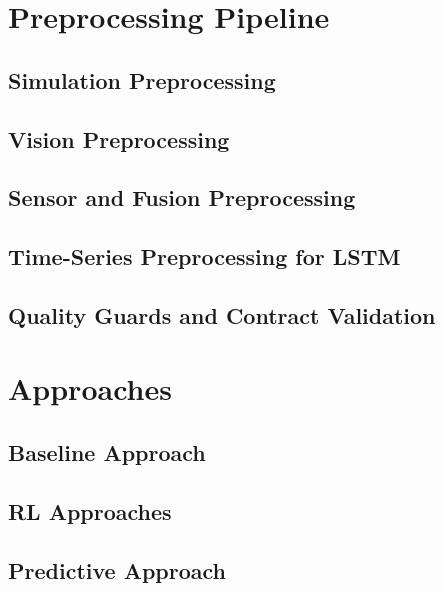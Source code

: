 \documentclass[conference]{IEEEtran}
\begin{document}
\section{Preprocessing Pipeline}
\subsection{Simulation Preprocessing}

\subsection{Vision Preprocessing}

\subsection{Sensor and Fusion Preprocessing}

\subsection{Time-Series Preprocessing for LSTM}

\subsection{Quality Guards and Contract Validation}

\section{Approaches}
\subsection{Baseline Approach}

\subsection{RL Approaches}

\subsection{Predictive Approach}
\end{document}
